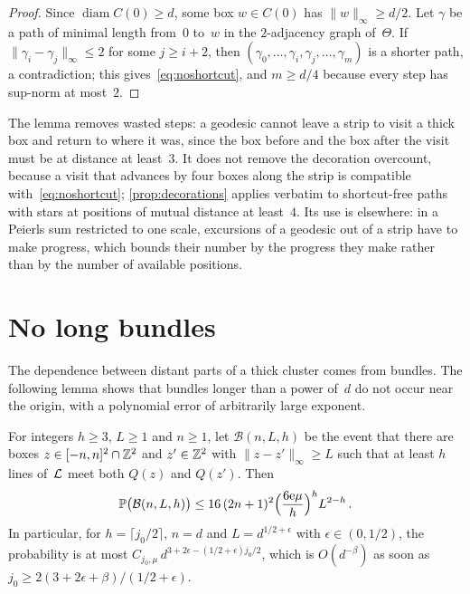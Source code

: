 \documentclass[11pt,letterpaper]{article}
\DeclareMathOperator{\diam}{diam}
\begin{document}
\begin{proof}
Since $\diam C(0)\ge d$, some box $w\in C(0)$ has $\lVert w\rVert_\infty\ge d/2$. Let $\gamma$ be a path of minimal length from~$0$ to~$w$ in the $2$-adjacency graph of~$\Theta$. If $\lVert\gamma_i-\gamma_j\rVert_\infty\le2$ for some $j\ge i+2$, then $(\gamma_0,\dots,\gamma_i,\gamma_j,\dots,\gamma_m)$ is a shorter path, a contradiction; this gives~\eqref{eq:noshortcut}, and $m\ge d/4$ because every step has sup-norm at most~$2$.
\end{proof}

The lemma removes wasted steps: a geodesic cannot leave a strip to visit a thick box and return to where it was, since the box before and the box after the visit must be at distance at least~$3$. It does not remove the decoration overcount, because a visit that advances by four boxes along the strip is compatible with~\eqref{eq:noshortcut}; \cref{prop:decorations} applies verbatim to shortcut-free paths with stars at positions of mutual distance at least~$4$. Its use is elsewhere: in a Peierls sum restricted to one scale, excursions of a geodesic out of a strip have to make progress, which bounds their number by the progress they make rather than by the number of available positions.

\section{No long bundles}
\label{sec:bundles}

The dependence between distant parts of a thick cluster comes from bundles. The following lemma shows that bundles longer than a power of~$d$ do not occur near the origin, with a polynomial error of arbitrarily large exponent.

\begin{lemma}
\label{lem:nobundle}
For integers $h\ge3$, $L\ge1$ and $n\ge1$, let $\mathcal B(n,L,h)$ be the event that there are boxes $z\in[-n,n]^2\cap\mathbb Z^2$ and $z'\in\mathbb Z^2$ with $\lVert z-z'\rVert_\infty\ge L$ such that at least $h$ lines of~$\mathcal L$ meet both $Q(z)$ and $Q(z')$. Then
\begin{equation}
\label{eq:nobundle}
  \mathbb P\bigl(\mathcal B(n,L,h)\bigr)\le16\,(2n+1)^2\Bigl(\frac{6\mathrm{e}\mu}{h}\Bigr)^hL^{2-h}\,.
\end{equation}
In particular, for $h=\lceil j_0/2\rceil$, $n=d$ and $L=d^{1/2+\epsilon}$ with $\epsilon\in(0,1/2)$, the probability is at most $C_{j_0,\mu}\,d^{3+2\epsilon-(1/2+\epsilon)j_0/2}$, which is $O(d^{-\beta})$ as soon as $j_0\ge2(3+2\epsilon+\beta)/(1/2+\epsilon)$.
\end{lemma}
\end{document}
